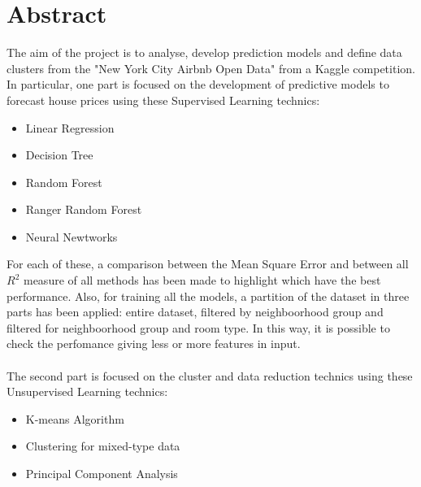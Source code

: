 \documentclass{FR16}
\begin{document}
\maketitle

\newpage
\tableofcontents
\newpage
\section{Abstract}
The aim of the project is to analyse, develop prediction models and define data clusters from the "New York City Airbnb Open Data" from a Kaggle competition.
\\ In particular, one part is focused on the development of predictive models to forecast house prices using these Supervised Learning technics:\begin{itemize}
\itemsep0em 
\item Linear Regression
\item Decision Tree
\item Random Forest
\item Ranger Random Forest
\item Neural Newtworks
\end{itemize}
For each of these, a comparison between the Mean Square Error and between all $R^2$ measure of all methods has been made to highlight which have the best performance. Also, for training all the models, a partition of the dataset in three parts has been applied: entire dataset, filtered by neighboorhood group and filtered for neighboorhood group and room type. In this way, it is possible to check the perfomance giving less or more features in input.\\\\
The second part is focused on the cluster and data reduction technics using these Unsupervised Learning technics:
\begin{itemize}
\itemsep0em
\item K-means Algorithm 
\item Clustering for mixed-type data
\item Principal Component Analysis
\end{itemize}
\end{document}
